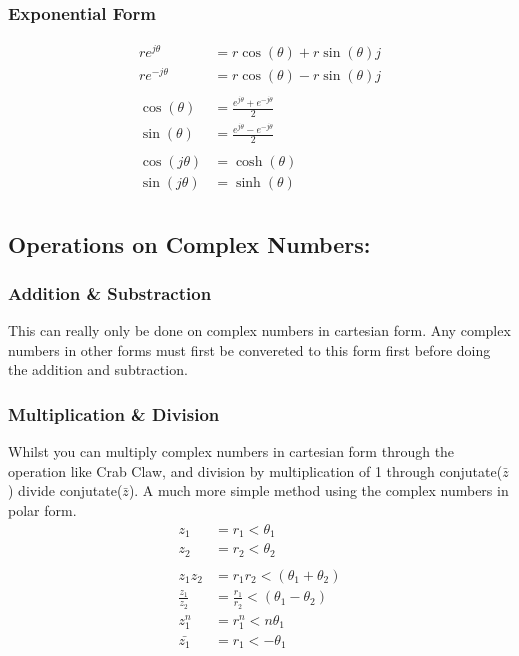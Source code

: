 \documentclass[a5paper]{article}
\begin{document}
	\subsubsection{Exponential Form}
	\begin{align*}
		re^{j\theta}&=r\cos(\theta)+r\sin(\theta)j\\
		re^{-j\theta}&=r\cos(\theta)-r\sin(\theta)j\\\\
		\cos(\theta)&=\frac{e^{j\theta}+e^{-j\theta}}{2}\\
		\sin(\theta)&=\frac{e^{j\theta}-e^{-j\theta}}{2}\\\\
		\cos(j\theta)&=\cosh(\theta)\\
		\sin(j\theta)&=\sinh(\theta)\\
	\end{align*}

	\subsection{Operations on Complex Numbers:}
	\subsubsection{Addition \& Substraction}
	This can really only be done on complex numbers in cartesian form. Any complex numbers in other forms must first be convereted to this form first before doing the addition and subtraction.
	\subsubsection{Multiplication \& Division}
	Whilst you can multiply complex numbers in cartesian form through the operation like Crab Claw, and division by multiplication of 1 through conjutate($\bar{z}$) divide conjutate($\bar{z}$).
	\hfill\break\break
	A much more simple method using the complex numbers in polar form.
	\begin{align*}
		z_{1}&=r_{1}<\theta_{1}\\
		z_{2}&=r_{2}<\theta_{2}\\\\
		z_{1}z_{2}&=r_{1}r_{2}<(\theta_{1}+\theta_{2})\\
		\frac{z_{1}}{z_{2}}&=\frac{r_{1}}{r_{2}}<(\theta_{1}-\theta_{2})\\
		z_{1}^{n}&=r_{1}^{n}<n\theta_{1}\\
		\bar{z_{1}}&=r_{1}<-\theta_{1}
	\end{align*}
\end{document}

